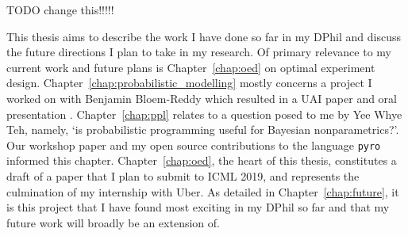 TODO change this!!!!!

This thesis aims to describe the work I have done so far in my DPhil and discuss the future directions I plan to take in my research. Of primary relevance to my current work and future plans is Chapter~\ref{chap:oed} on optimal experiment design. Chapter~\ref{chap:probabilistic_modelling} mostly concerns a project I worked on with Benjamin Bloem-Reddy which resulted in a UAI paper and oral presentation \cite{bntl}. Chapter~\ref{chap:ppl} relates to a question posed to me by Yee Whye Teh, namely, `is probabilistic programming useful for Bayesian nonparametrics?'. Our workshop paper \cite{bnpppl} and my open source contributions to the language \texttt{pyro} informed this chapter. Chapter~\ref{chap:oed}, the heart of this thesis, constitutes a draft of a paper that I plan to submit to ICML 2019, and represents the culmination of my internship with Uber. As detailed in Chapter~\ref{chap:future}, it is this project that I have found most exciting in my DPhil so far and that my future work will broadly be an extension of.